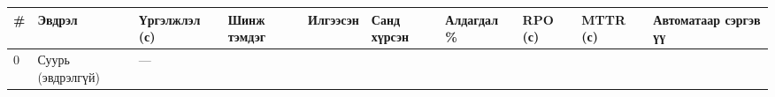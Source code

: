 \begingroup\scriptsize\begin{longtable}[]{@{}llllllllll@{}}
\toprule
\begin{minipage}[b]{0.07\columnwidth}\raggedright
\#\strut
\end{minipage} & \begin{minipage}[b]{0.07\columnwidth}\raggedright
Эвдрэл\strut
\end{minipage} & \begin{minipage}[b]{0.07\columnwidth}\raggedright
Үргэлжлэл (с)\strut
\end{minipage} & \begin{minipage}[b]{0.07\columnwidth}\raggedright
Шинж тэмдэг\strut
\end{minipage} & \begin{minipage}[b]{0.07\columnwidth}\raggedright
Илгээсэн\strut
\end{minipage} & \begin{minipage}[b]{0.07\columnwidth}\raggedright
Санд хүрсэн\strut
\end{minipage} & \begin{minipage}[b]{0.07\columnwidth}\raggedright
Алдагдал \%\strut
\end{minipage} & \begin{minipage}[b]{0.07\columnwidth}\raggedright
RPO (с)\strut
\end{minipage} & \begin{minipage}[b]{0.07\columnwidth}\raggedright
MTTR (с)\strut
\end{minipage} & \begin{minipage}[b]{0.07\columnwidth}\raggedright
Автоматаар сэргэв үү\strut
\end{minipage}\tabularnewline
\midrule
\endhead
\begin{minipage}[t]{0.07\columnwidth}\raggedright
0\strut
\end{minipage} & \begin{minipage}[t]{0.07\columnwidth}\raggedright
Суурь (эвдрэлгүй)\strut
\end{minipage} & \begin{minipage}[t]{0.07\columnwidth}\raggedright
---\strut
\end{minipage} & \begin{minipage}[t]{0.07\columnwidth}\raggedright
\strut
\end{minipage} & \begin{minipage}[t]{0.07\columnwidth}\raggedright
\strut
\end{minipage} & \begin{minipage}[t]{0.07\columnwidth}\raggedright

\end{minipage}
\end{longtable}
